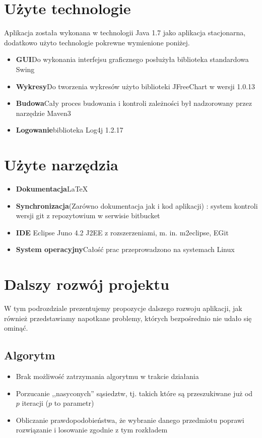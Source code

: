 \documentclass[a4paper,12pt,notitlepage]{mwrep}
\begin{document}
\section{Użyte technologie}
Aplikacja została wykonana w technologii Java 1.7
jako aplikacja stacjonarna,
dodatkowo użyto technologie pokrewne wymienione poniżej.
\begin{itemize}
	\item	\textbf{GUI}\quad Do wykonania interfejsu graficznego posłużyła biblioteka standardowa Swing
	\item	\textbf{Wykresy}\quad Do tworzenia wykresów użyto biblioteki JFreeChart w wersji 1.0.13
	\item	\textbf{Budowa}\quad Cały proces budowania i kontroli zależności był nadzorowany przez narzędzie
					Maven3
	\item	\textbf{Logowanie}\quad biblioteka Log4j 1.2.17
\end{itemize}

\section{Użyte narzędzia}
\begin{itemize}
	\item	\textbf{Dokumentacja}\quad \LaTeX
	\item	\textbf{Synchronizacja}\quad (Zarówno dokumentacja jak i kod aplikacji) : system kontroli wersji git
			z repozytowium w serwisie bitbucket
	\item	\textbf{IDE\quad} Eclipse Juno 4.2 J2EE z rozszerzeniami, m. in. m2eclipse, EGit
	\item	\textbf{System operacyjny}\quad Całość prac przeprowadzono na systemach Linux
\end{itemize}

\section{Dalszy rozwój projektu}
W tym podrozdziale prezentujemy propozycje dalszego rozwoju aplikacji, jak również przedstawiamy napotkane problemy, których
bezpośrednio nie udało się ominąć.
\subsection{Algorytm}
\begin{itemize}
	\item	Brak możliwość zatrzymania algorytmu w trakcie działania
	\item	Porzucanie ,,nasyconych'' sąsiedztw, tj. takich które są przeszukiwane już od $p$ iteracji ($p$ to parametr)
	\item	Obliczanie prawdopodobieństwa, że wybranie danego przedmiotu poprawi rozwiązanie i losowanie
		zgodnie z tym rozkładem
\end{itemize}
\end{document}
